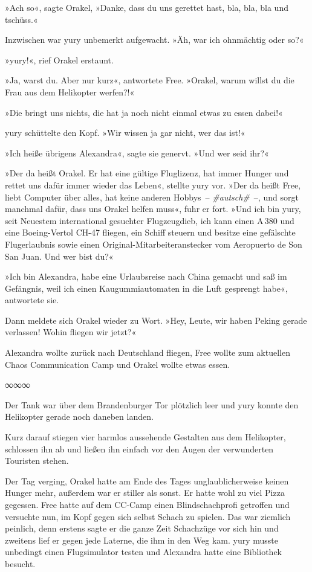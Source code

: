 »Ach so«, sagte Orakel, »Danke, dass du uns gerettet hast, bla, bla, bla und tschüss.«

Inzwischen war yury unbemerkt aufgewacht. »Äh, war ich ohnmächtig oder so?«

»yury!«, rief Orakel erstaunt.

»Ja, warst du. Aber nur kurz«, antwortete Free. »Orakel, warum willst du die Frau aus dem Helikopter werfen?!«

»Die bringt uns nichts, die hat ja noch nicht einmal etwas zu essen dabei!«

yury schüttelte den Kopf. »Wir wissen ja gar nicht, wer das ist!«

»Ich heiße übrigens Alexandra«, sagte sie genervt. »Und wer seid ihr?«

»Der da heißt Orakel. Er hat eine gültige Fluglizenz, hat immer Hunger und rettet uns dafür immer wieder das Leben«, stellte yury vor. »Der da heißt Free, liebt Computer über alles, hat keine anderen Hobbys~– \textit{\#autsch\#}~–, und sorgt manchmal dafür, dass uns Orakel helfen muss«, fuhr er fort. »Und ich bin yury, seit Neuestem international gesuchter Flugzeugdieb, ich kann einen A\,380 und eine Boeing-Vertol CH-47 fliegen, ein Schiff steuern und besitze eine gefälschte Flugerlaubnis sowie einen Original-Mitarbeiteranstecker vom Aeropuerto de Son San Juan. Und wer bist du?«

»Ich bin Alexandra, habe eine Urlaubsreise nach China gemacht und saß im Gefängnis, weil ich einen Kaugummiautomaten in die Luft gesprengt habe«, antwortete sie.

Dann meldete sich Orakel wieder zu Wort. »Hey, Leute, wir haben Peking gerade verlassen! Wohin fliegen wir jetzt?«

Alexandra wollte zurück nach Deutschland fliegen, Free wollte zum aktuellen Chaos Communication Camp und Orakel wollte etwas essen.

\begin{center}
    ∞∞∞
\end{center}

Der Tank war über dem Brandenburger Tor plötzlich leer und yury konnte den Helikopter gerade noch daneben landen.

Kurz darauf stiegen vier harmlos aussehende Gestalten aus dem Helikopter, schlossen ihn ab und ließen ihn einfach vor den Augen der verwunderten Touristen stehen.

Der Tag verging, Orakel hatte am Ende des Tages unglaublicherweise keinen Hunger mehr, außerdem war er stiller als sonst. Er hatte wohl zu viel Pizza gegessen. Free hatte auf dem CC-Camp einen Blindschachprofi getroffen und versuchte nun, im Kopf gegen sich selbst Schach zu spielen. Das war ziemlich peinlich, denn erstens sagte er die ganze Zeit Schachzüge vor sich hin und zweitens lief er gegen jede Laterne, die ihm in den Weg kam. yury musste unbedingt einen Flugsimulator testen und Alexandra hatte eine Bibliothek besucht.

